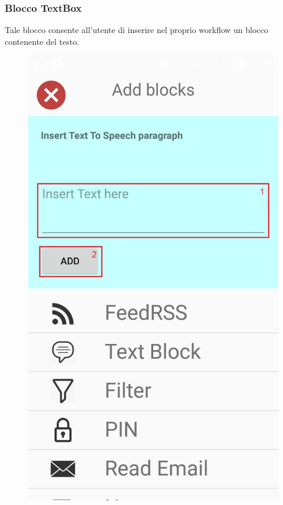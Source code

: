 \subsubsection{Blocco TextBox}
Tale blocco consente all'utente di inserire nel proprio workflow un blocco contenente del testo.

\begin{figure}[!ht]
\centering
\includegraphics[scale=0.2]{images/BlockTextToSpeech}
\caption{}
\end{figure}

